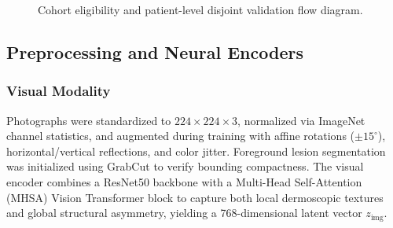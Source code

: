 \documentclass[conference]{IEEEtran}
\begin{document}
\begin{figure}[t]
\centering
{}
\caption{Cohort eligibility and patient-level disjoint validation flow diagram.}
\label{fig:cohort_flow}
\end{figure}

\subsection{Preprocessing and Neural Encoders}
\subsubsection{Visual Modality}
Photographs were standardized to $224 \times 224 \times 3$, normalized via ImageNet channel statistics, and augmented during training with affine rotations ($\pm 15^\circ$), horizontal/vertical reflections, and color jitter. Foreground lesion segmentation was initialized using GrabCut \cite{rother2004grabcut} to verify bounding compactness. The visual encoder combines a ResNet50 backbone \cite{he2016deep} with a Multi-Head Self-Attention (MHSA) Vision Transformer block \cite{dosovitskiy2021image} to capture both local dermoscopic textures and global structural asymmetry, yielding a 768-dimensional latent vector $z_{\text{img}}$.
\end{document}
